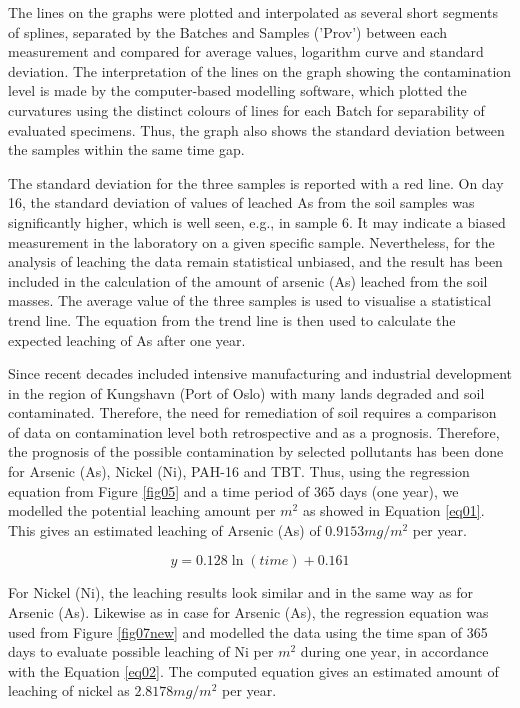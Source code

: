 \documentclass[algorithms,article,submit,pdftex,moreauthors]{Definitions/mdpi}
\begin{document}
The lines on the graphs were plotted and interpolated as several short segments of splines, separated by the Batches and Samples ('Prov') between each measurement and compared for average values, logarithm curve and standard deviation. The interpretation of the lines on the graph showing the contamination level is made by the computer-based modelling software, which plotted the curvatures using the distinct colours of lines for each Batch for separability of evaluated specimens. Thus, the graph also shows the standard deviation between the samples within the same time gap. 

The standard deviation for the three samples is reported with a red line. On day 16, the standard deviation of values of leached As from the soil samples was significantly higher, which is well seen, e.g., in sample 6. It may indicate a biased measurement in the laboratory on a given specific sample. Nevertheless, for the analysis of leaching the data remain statistical unbiased, and the result has been included in the calculation of the amount of arsenic (As) leached from the soil masses. The average value of the three samples is used to visualise a statistical trend line. The equation from the trend line is then used to calculate the expected leaching of As after one year. 

Since recent decades included intensive manufacturing and industrial development in the region of Kungshavn (Port of Oslo) with many lands degraded and soil contaminated. Therefore, the need for remediation of soil requires a comparison of data on contamination level both retrospective and as a prognosis. Therefore, the prognosis of the possible contamination by selected pollutants has been done for Arsenic (As), Nickel (Ni), PAH-16 and TBT. Thus, using the regression equation from Figure \ref{fig05} and a time period of 365 days (one year), we modelled the potential leaching amount per $m^2$ as showed in Equation \ref{eq01}. This gives an estimated leaching of Arsenic (As) of $0.9153 mg/m^2$ per year.

\begin{equation}\label{eq01}
	y= 0.128 \ln(time) + 0.161
\end{equation}

For Nickel (Ni), the leaching results look similar and in the same way as for Arsenic (As). Likewise as in case for Arsenic (As), the regression equation was used from Figure \ref{fig07new} and modelled the data using the time span of 365 days to evaluate possible  leaching of Ni per $m^2$ during one year, in accordance with the Equation \ref{eq02}. The computed equation gives an estimated amount of leaching of nickel as $2.8178 mg/m^2$ per year.
\end{document}
